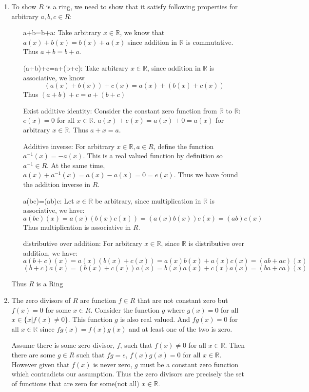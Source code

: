 \documentclass[11pt, oneside]{article}
\newcommand{\R}{\mathbb R}
\begin{document}
\begin{enumerate}
\begin{enumerate}
    \item To show $R$ is a ring, we need to show that it satisfy following properties for arbitrary $a,b,c\in R$:\begin{enumerate}
        \item[a+b=b+a: ] Take arbitrary $x\in \R$, we know that $a(x)+b(x)=b(x)+a(x)$ since addition in $\R$ is commutative. Thus $a+b=b+a$.
        \item[(a+b)+c=a+(b+c): ] Take arbitrary $x\in \R$, since addition in $\R$ is associative, we know \[(a(x)+b(x))+c(x)=a(x)+(b(x)+c(x))\]
        Thus $(a+b)+c=a+(b+c)$
        \item[Exist additive identity: ] Consider the constant zero function from $\R$ to $\R$: $e(x)=0$ for all $x\in \R$. $a(x)+e(x)=a(x)+0=a(x)$ for arbitrary $x\in \R$. Thus $a+x=a$.
        \item[Additive inverse: ] For arbitrary $x\in \R, a\in R$, define the function $a^{-1}(x)=-a(x)$. This is a real valued function by definition so $a^{-1}\in R$. At the same time, $a(x)+a^{-1}(x)=a(x)-a(x)=0=e(x)$. Thus we have found the addition inverse in $R$.
        \item[a(bc)=(ab)c: ] Let $x\in \R$ be arbitrary, since multiplication in $\R$ is associative, we have:
        \[a(bc)(x)=a(x)(b(x)c(x))=(a(x)b(x))c(x)=(ab)c(x)\]
        Thus multiplication is associative in $R$.
        \item[distributive over addition:] For arbitrary $x\in \R$, since $\R$ is distributive over addition, we have:
        \[a(b+c)(x)=a(x)(b(x)+c(x))=a(x)b(x)+a(x)c(x)=(ab+ac)(x)\]
        \[(b+c)a(x)=(b(x)+c(x))a(x)=b(x)a(x)+c(x)a(x)=(ba+ca)(x)\]
    \end{enumerate}
    Thus $R$ is a Ring
    \item The zero divisors of $R$ are function $f\in R$ that are not constant zero but $f(x)=0$ for some $x\in R$. Consider the function $g$ where $g(x)=0$ for all $x\in\{x|f(x)\neq 0\}$. This function $g$ is also real valued. And $fg(x)=0$ for all $x\in \R$ since $fg(x)=f(x)g(x)$ and at least one of the two is zero.
    
    Assume there is some zero divisor, $f$, such that $f(x)\neq 0$ for all $x\in \R$. Then there are some $g\in R$ such that $fg=e$, $f(x)g(x)=0$ for all $x\in \R$. However given that $f(x)$ is never zero, $g$ must be a constant zero function which contradicts our assumption. Thus the zero divisors are precisely the set of functions that are zero for some(not all) $x\in \R$.
    

\end{enumerate}
\end{enumerate}
\end{document}
